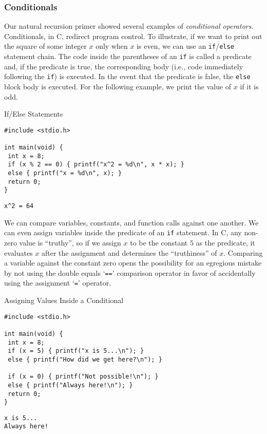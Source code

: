 \subsubsection*{Conditionals}

Our natural recursion primer showed several examples of \textit{conditional operators}. Conditionals, in C, redirect program control. To illustrate, if we want to print out the square of some integer $x$ only when $x$ is even, we can use an \texttt{if}/\texttt{else} statement chain. The code inside the parentheses of an \texttt{if} is called a predicate and, if the predicate is true, the corresponding body (i.e., code immediately following the \texttt{if}) is executed. In the event that the predicate is false, the \texttt{else} block body is executed. For the following example, we print the value of $x$ if it is odd.

\begin{clo}[main.c]{If/Else Statements}
\begin{lstlisting}[language=MyC]
#include <stdio.h>

int main(void) {
 int x = 8;
 if (x % 2 == 0) { printf("x^2 = %d\n", x * x); }
 else { printf("x = %d\n", x); }
 return 0;
}
\end{lstlisting}
\tcblower
\begin{lstlisting}[language=MyOutput]
x^2 = 64
\end{lstlisting}
\end{clo}

We can compare variables, constants, and function calls against one another. We can even assign variables inside the predicate of an \texttt{if} statement. In C, any non-zero value is ``truthy'', so if we assign $x$ to be the constant $5$ as the predicate, it evaluates $x$ after the assignment and determines the ``truthiness'' of $x$. Comparing a variable against the constant zero opens the possibility for an egregious mistake by not using the double equals `\texttt{==}' comparison operator in favor of accidentally using the assignment `\texttt{=}' operator.

\begin{clo}[]{Assigning Values Inside a Conditional}
\begin{lstlisting}[language=MyC]
#include <stdio.h>

int main(void) {
 int x = 8;
 if (x = 5) { printf("x is 5...\n"); }
 else { printf("How did we get here?\n"); }

 if (x = 0) { printf("Not possible!\n"); }
 else { printf("Always here!\n"); }
 return 0;
}
\end{lstlisting}
\tcblower
\begin{lstlisting}[language=MyOutput]
x is 5...
Always here!
\end{lstlisting}
\end{clo}

